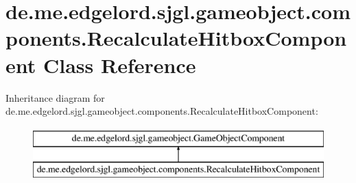 \hypertarget{classde_1_1me_1_1edgelord_1_1sjgl_1_1gameobject_1_1components_1_1_recalculate_hitbox_component}{}\section{de.\+me.\+edgelord.\+sjgl.\+gameobject.\+components.\+Recalculate\+Hitbox\+Component Class Reference}
\label{classde_1_1me_1_1edgelord_1_1sjgl_1_1gameobject_1_1components_1_1_recalculate_hitbox_component}
Inheritance diagram for de.\+me.\+edgelord.\+sjgl.\+gameobject.\+components.\+Recalculate\+Hitbox\+Component\+:\begin{figure}[H]
\begin{center}
\leavevmode
\includegraphics[height=2.000000cm]{classde_1_1me_1_1edgelord_1_1sjgl_1_1gameobject_1_1components_1_1_recalculate_hitbox_component}
\end{center}
\end{figure}
